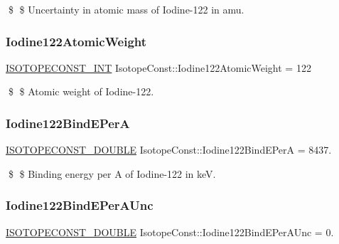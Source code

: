 \$ \$ Uncertainty in atomic mass of Iodine-\/122 in amu. \mbox{\label{group___isotope_const-_iodine-_i122_gaa907887d384dbbc1481aec6a483162fb}} 
\subsubsection{\texorpdfstring{Iodine122\+Atomic\+Weight}{Iodine122AtomicWeight}}
{\footnotesize\ttfamily \mbox{\hyperlink{group___isotope_const-_macros_ga5f18360b3e99483a35c32d789e62621c}{I\+S\+O\+T\+O\+P\+E\+C\+O\+N\+S\+T\+\_\+\+I\+NT}} Isotope\+Const\+::\+Iodine122\+Atomic\+Weight = 122}

\$ \$ Atomic weight of Iodine-\/122. \mbox{\label{group___isotope_const-_iodine-_i122_ga985cd917178c8d7c9e32675ee7da3c8b}} 
\subsubsection{\texorpdfstring{Iodine122\+Bind\+E\+PerA}{Iodine122BindEPerA}}
{\footnotesize\ttfamily \mbox{\hyperlink{group___isotope_const-_macros_ga8f45a7272ce02c0b4c65c44636ed719a}{I\+S\+O\+T\+O\+P\+E\+C\+O\+N\+S\+T\+\_\+\+D\+O\+U\+B\+LE}} Isotope\+Const\+::\+Iodine122\+Bind\+E\+PerA = 8437.}

\$ \$ Binding energy per A of Iodine-\/122 in keV. \mbox{\label{group___isotope_const-_iodine-_i122_ga967eb10a0cd1b378d94267194d747124}} 
\subsubsection{\texorpdfstring{Iodine122\+Bind\+E\+Per\+A\+Unc}{Iodine122BindEPerAUnc}}
{\footnotesize\ttfamily \mbox{\hyperlink{group___isotope_const-_macros_ga8f45a7272ce02c0b4c65c44636ed719a}{I\+S\+O\+T\+O\+P\+E\+C\+O\+N\+S\+T\+\_\+\+D\+O\+U\+B\+LE}} Isotope\+Const\+::\+Iodine122\+Bind\+E\+Per\+A\+Unc = 0.}

